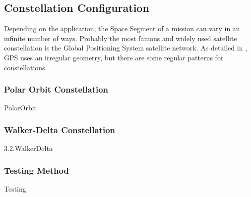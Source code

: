 \subsection{Constellation Configuration}



Depending on the application, the Space Segment of a mission can vary in an infinite number of ways. Probably the most famous and widely used satellite constellation is the Global Positioning System satellite network. As detailed in \cite[Chapter 3, Section 1]{annex1}, GPS uses an irregular geometry, but there are some regular patterns for constellations.

\subsubsection{Polar Orbit Constellation}\label{PolarOrbit}
{PolarOrbit}

\subsubsection{Walker-Delta Constellation}
{3.2.WalkerDelta}

\subsubsection{Testing Method}\label{Testing}
{Testing}

